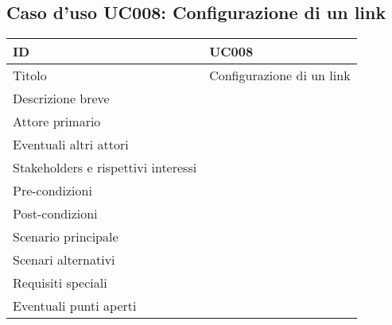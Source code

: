 \documentclass[../../main.tex]{subfiles}
\begin{document}
\subsection{Caso d’uso UC008: Configurazione di un link }
\begin{tabularx}{150mm}{|l|X|}
    \hline
    ID                                  & \textbf{UC008}\\
    \hline
    Titolo                              & Configurazione di un link \\
    \hline
    Descrizione breve                   &    \\
    \hline
    Attore primario                     &    \\
    \hline
    Eventuali altri attori              &    \\
    \hline
    Stakeholders e rispettivi interessi &    \\
    \hline
    Pre-condizioni                      &    \\
    \hline
    Post-condizioni                     &    \\
    \hline
    Scenario principale                 &    \\
    \hline
    Scenari alternativi                 &    \\
    \hline
    Requisiti speciali                  &    \\
    \hline
    Eventuali punti aperti              &    \\
    \hline
\end{tabularx}
\newpage
\end{document}
